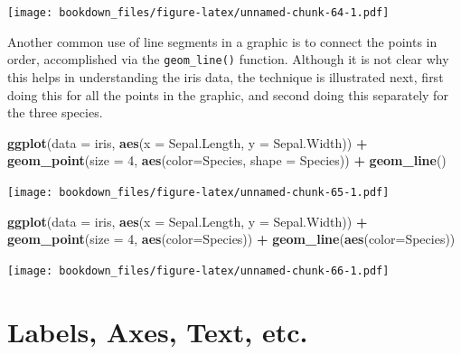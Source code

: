 \documentclass[
]{krantz}
\makeatletter
\newenvironment{Shaded}{\begin{snugshade}}{\end{snugshade}}
\newcommand{\DataTypeTok}[1]{\textcolor[rgb]{0.27,0.27,0.27}{#1}}
\newcommand{\DecValTok}[1]{\textcolor[rgb]{0.06,0.06,0.06}{#1}}
\newcommand{\KeywordTok}[1]{\textcolor[rgb]{0.27,0.27,0.27}{\textbf{#1}}}
\newcommand{\NormalTok}[1]{#1}
\newcommand{\OperatorTok}[1]{\textcolor[rgb]{0.43,0.43,0.43}{\textbf{#1}}}
\newcommand{\StringTok}[1]{\textcolor[rgb]{0.5,0.5,0.5}{#1}}
\newenvironment{kframe}{%
\medskip{}
\setlength{\fboxsep}{.8em}
 \def\at@end@of@kframe{}%
 \ifinner\ifhmode%
  \def\at@end@of@kframe{\end{minipage}}%
  \begin{minipage}{\columnwidth}%
 \fi\fi%
 \def\FrameCommand##1{\hskip\@totalleftmargin \hskip-\fboxsep
 \colorbox{shadecolor}{##1}\hskip-\fboxsep
     \hskip-\linewidth \hskip-\@totalleftmargin \hskip\columnwidth}%
 \MakeFramed {\advance\hsize-\width
   \@totalleftmargin\z@ \linewidth\hsize
   \@setminipage}}%
 {\par\unskip\endMakeFramed%
 \at@end@of@kframe}
\renewenvironment{Shaded}{\begin{kframe}}{\end{kframe}}
\makeatother
\begin{document}
\texttt{[image: bookdown\_files/figure-latex/unnamed-chunk-64-1.pdf]}

Another common use of line segments in a graphic is to connect the points in order, accomplished via the \texttt{geom\_line()} function. Although it is not clear why this helps in understanding the iris data, the technique is illustrated next, first doing this for all the points in the graphic, and second doing this separately for the three species.

\begin{Shaded}
\begin{Highlighting}[]
\KeywordTok{ggplot}\NormalTok{(}\DataTypeTok{data =}\NormalTok{ iris, }\KeywordTok{aes}\NormalTok{(}\DataTypeTok{x =}\NormalTok{ Sepal.Length, }\DataTypeTok{y =}\NormalTok{ Sepal.Width)) }\OperatorTok{+}\StringTok{ }
\StringTok{    }\KeywordTok{geom\_point}\NormalTok{(}\DataTypeTok{size =} \DecValTok{4}\NormalTok{, }\KeywordTok{aes}\NormalTok{(}\DataTypeTok{color=}\NormalTok{Species, }\DataTypeTok{shape =}\NormalTok{ Species)) }\OperatorTok{+}\StringTok{ }
\StringTok{    }\KeywordTok{geom\_line}\NormalTok{()}
\end{Highlighting}
\end{Shaded}

\texttt{[image: bookdown\_files/figure-latex/unnamed-chunk-65-1.pdf]}

\begin{Shaded}
\begin{Highlighting}[]
\KeywordTok{ggplot}\NormalTok{(}\DataTypeTok{data =}\NormalTok{ iris, }\KeywordTok{aes}\NormalTok{(}\DataTypeTok{x =}\NormalTok{ Sepal.Length, }\DataTypeTok{y =}\NormalTok{ Sepal.Width)) }\OperatorTok{+}\StringTok{ }
\StringTok{    }\KeywordTok{geom\_point}\NormalTok{(}\DataTypeTok{size =} \DecValTok{4}\NormalTok{, }\KeywordTok{aes}\NormalTok{(}\DataTypeTok{color=}\NormalTok{Species)) }\OperatorTok{+}\StringTok{ }
\StringTok{    }\KeywordTok{geom\_line}\NormalTok{(}\KeywordTok{aes}\NormalTok{(}\DataTypeTok{color=}\NormalTok{Species))}
\end{Highlighting}
\end{Shaded}

\texttt{[image: bookdown\_files/figure-latex/unnamed-chunk-66-1.pdf]}

\hypertarget{labels-axes-text-etc.}{%
\section{Labels, Axes, Text, etc.}\label{labels-axes-text-etc.}}
\end{document}
